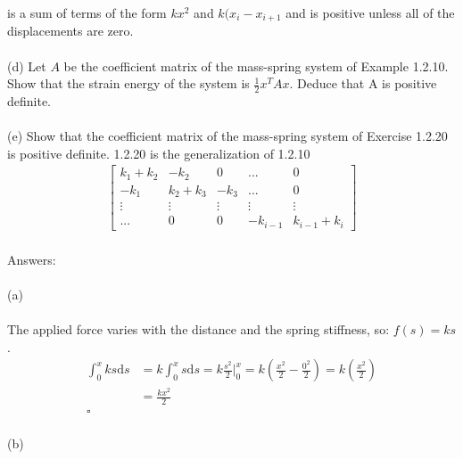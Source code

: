 \documentclass{article}
\begin{document}
	is a sum of terms of the form $kx^2$ and $k(x_i - x_{i+1}$ and is positive unless all 
	of the displacements are zero.\\
	\\
	(d) Let $A$ be the coefficient matrix of the mass-spring system of Example 1.2.10. 
	Show that the strain energy of the system is $\frac{1}{2}x^TAx$. Deduce that A is positive 
	definite.\\ 
	\\
	(e) Show that the coefficient matrix of the mass-spring system of Exercise 1.2.20 is positive definite. 1.2.20 is the generalization of 1.2.10\\
	\begin{align*}
		\begin{bmatrix}
		k_1+k_2&-k_2&0&...&0\\
		-k_1&k_2+k_3&-k_3&...&0\\
		\vdots&\vdots&\vdots&\vdots&\vdots\\
		...&0&0&-k_{i-1}&k_{i-1}+k_i
		\end{bmatrix}
	\end{align*}
	\\
	Answers:\\
	\\
	(a)\\
	\\
	The applied force varies with the distance and the spring stiffness, so: $f(s)=ks$.
	\begin{align*}
		\int_{0}^{x}{ks\mathrm{d}s} &= k\int_{0}^{x}{s\mathrm{d}s} = k\frac{s^2}{2}\Big|_0^x = k(\frac{x^2}{2}-\frac{0^2}{2}) = k(\frac{x^2}{2})\\
		&=\frac{kx^2}{2}\\
		\square
	\end{align*}
	\\
	(b)\\
	\\
\end{document}
